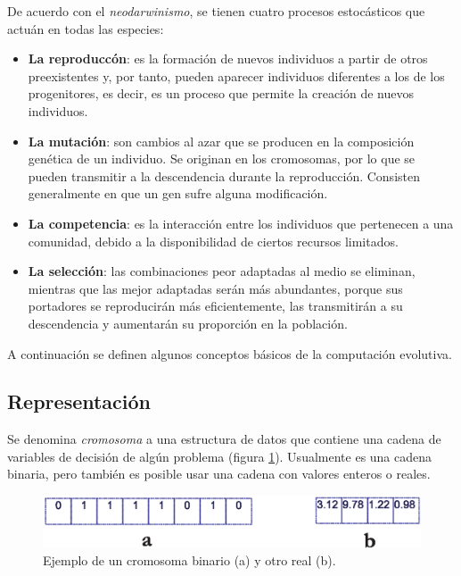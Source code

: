 \begin{itemize}
   De acuerdo con el \textit{neodarwinismo}, se tienen cuatro procesos estoc\'asticos que actu\'an en todas las especies:
   \begin{itemize}
    \item \textbf{La reproducc\'on}: es la formaci\'on de nuevos individuos a partir de otros preexistentes y, por tanto, 
    pueden aparecer individuos diferentes a los de los progenitores, es decir, es un proceso que permite la creaci\'on 
    de nuevos individuos.
    \item \textbf{La mutaci\'on}: son cambios al azar que se producen en la composici\'on gen\'etica de un individuo. Se 
    originan en los cromosomas, por lo que se pueden transmitir a la descendencia durante la reproducci\'on. Consisten 
    generalmente en que un gen sufre alguna modificaci\'on. 
    \item \textbf{La competencia}: es la interacci\'on entre los individuos que pertenecen a una comunidad, debido a la 
    disponibilidad de ciertos recursos limitados.
    \item \textbf{La selecci\'on}: las combinaciones peor adaptadas al medio se eliminan, mientras que las mejor adaptadas 
    ser\'an m\'as abundantes, porque sus portadores se reproducir\'an m\'as eficientemente, las transmitir\'an a su descendencia 
    y aumentar\'an su proporci\'on en la poblaci\'on. 
   \end{itemize}
  \end{itemize}
  
  A continuaci\'on se definen algunos conceptos b\'asicos de la computaci\'on evolutiva.
  
  \subsection{Representaci\'on}
  
  Se denomina \textit{cromosoma} a una estructura de datos que contiene una cadena de variables de decisi\'on de alg\'un 
  problema (figura \ref{fig:cromosoma}). Usualmente es una cadena binaria, pero tambi\'en es posible usar una cadena con 
  valores enteros o reales.

  \begin{figure}[H]
	\centering
	\includegraphics[scale=0.70]{Cap2/1-16.eps}
	  \caption{Ejemplo de un cromosoma binario (a) y otro real (b).}
      \label{fig:cromosoma}
      \end{figure}
  
